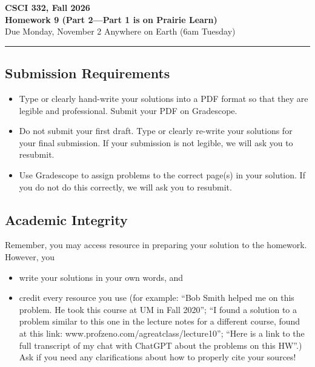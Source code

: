 \documentclass[11pt]{article}
\begin{document}
\begin{center}
\Large\textbf{CSCI 332, Fall 2026}%
\\
\LARGE\textbf{Homework 9 (Part 2---Part 1 is on Prairie Learn)}%
\\[0.5ex]
\large Due Monday, November 2 Anywhere on Earth (6am Tuesday)
\end{center}

\bigskip
\hrule
\bigskip

\subsection*{Submission Requirements}
\begin{itemize}
    \item Type or clearly hand-write your solutions into a PDF format so that they are legible and professional. Submit your PDF on Gradescope. 
    \item Do not submit your first draft. Type or clearly re-write your solutions for your final submission. If your submission is not legible, we will ask you to resubmit.
    \item Use Gradescope to assign problems to the correct page(s) in your solution. If you do not do this correctly, we will ask you to resubmit.
\end{itemize}

\subsection*{Academic Integrity}

Remember, you may access  resource in preparing your solution to the homework. However, you 
\begin{itemize}
    \item write your solutions in your own words, and
    \item credit every resource you use (for example: ``Bob Smith helped me on
    this problem. He took this course at UM in Fall 2020''; ``I found a solution
    to a problem similar to this one in the lecture notes for a different
    course, found at this link: www.profzeno.com/agreatclass/lecture10''; ``Here is a link to the full transcript of my chat with ChatGPT about the problems on this HW''.)
    Ask if you need any clarifications about how to properly cite your sources!
\end{itemize}




\newpage
    
\end{document}
